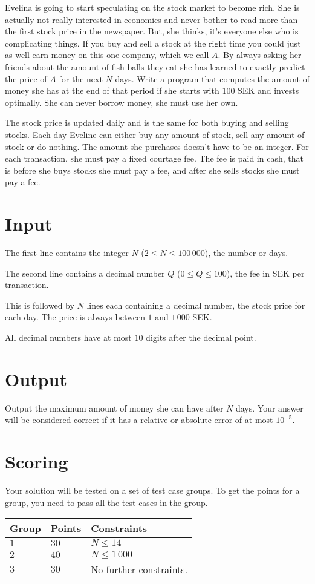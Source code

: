 Evelina is going to start speculating on the stock market to become rich.
She is actually not really interested in economics and never bother to read more than the first stock price in the newspaper.
But, she thinks, it's everyone else who is complicating things.
If you buy and sell a stock at the right time you could just as well earn money on this one company, which we call $A$.
By always asking her friends about the amount of fish balls they eat she has learned to exactly predict the price of $A$ for the next $N$ days.
Write a program that computes the amount of money she has at the end of that period if she starts with $100$ SEK and invests optimally.
She can never borrow money, she must use her own.

The stock price is updated daily and is the same for both buying and selling stocks.
Each day Eveline can either buy any amount of stock, sell any amount of stock or do nothing.
The amount she purchases doesn't have to be an integer.
For each transaction, she must pay a fixed courtage fee.
The fee is paid in cash, that is before she buys stocks she must pay a fee, and after she sells stocks she must pay a fee.

\section*{Input}
The first line contains the integer $N$ ($2 \le N \le 100\,000$), the number or days.

The second line contains a decimal number $Q$ ($0 \le Q \le 100$), the fee in SEK per transaction.

This is followed by $N$ lines each containing a decimal number, the stock price for each day.
The price is always between $1$ and $1\,000$ SEK.

All decimal numbers have at most $10$ digits after the decimal point.

\section*{Output}
Output the maximum amount of money she can have after $N$ days.
Your answer will be considered correct if it has a relative or absolute error of at most $10^{-5}$.

\section*{Scoring}
Your solution will be tested on a set of test case groups.
To get the points for a group, you need to pass all the test cases in the group.

\noindent
\begin{tabular}{| l | l | p{10cm} |}
\hline
Group & Points & Constraints \\ \hline
  $1$    & $30$        & $N \le 14$ \\ \hline 
  $2$    & $40$        & $N \le 1\,000$ \\ \hline
  $3$    & $30$        & No further constraints. \\ \hline 
\end{tabular}

